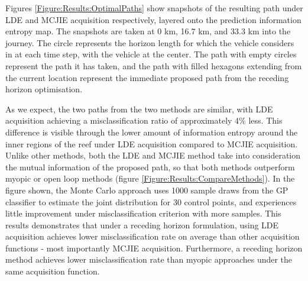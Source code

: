 \documentclass{article}
\begin{document}
		
		Figures \ref{Figure:Results:OptimalPaths} show snapshots of the resulting path under LDE and MCJIE acquisition respectively, layered onto the prediction information entropy map. The snapshots are taken at 0 km, 16.7 km, and 33.3 km into the journey. The circle represents the horizon length for which the vehicle considers in at each time step, with the vehicle at the center. The path with empty circles represent the path it has taken, and the path with filled hexagons extending from the current location represent the immediate proposed path from the receding horizon optimisation.
		
		As we expect, the two paths from the two methods are similar, with LDE acquisition achieving a misclassification ratio of approximately 4\% less. This difference is visible through the lower amount of information entropy around the inner regions of the reef under LDE acquisition compared to MCJIE acquisition. Unlike other methods, both the LDE and MCJIE method take into consideration the mutual information of the proposed path, so that both methods outperform myopic or open loop methods (figure \ref{Figure:Results:CompareMethods}). In the figure shown, the Monte Carlo approach uses 1000 sample draws from the GP classifier to estimate the joint distribution for 30 control points, and experiences little improvement under misclassification criterion with more samples. This results demonstrates that under a receding horizon formulation, using LDE acquisition achieves lower misclassification rate on average than other acquisition functions - most importantly MCJIE acquisition. Furthermore, a receding horizon method achieves lower misclassification rate than myopic approaches under the same acquisition function.
			
\end{document}
